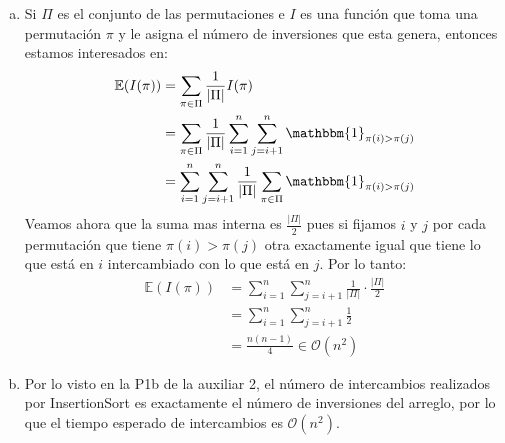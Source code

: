 \documentclass[dcc,uchile]{fcfmcourse}
\begin{document}
\begin{problems}
\begin{enumerate}[a)]
    \item Si $\Pi$ es el conjunto de las permutaciones e $I$ es una función que toma una permutación $\pi$ y le asigna el número de inversiones que esta genera, entonces estamos interesados en:
    \begin{align*}
        \mathbb{E}(I(\pi)) &= \sum_{\pi \in \Pi} \frac{1}{|\Pi|}I(\pi)\\
        &= \sum_{\pi \in \Pi} \frac{1}{|\Pi|}\sum_{i=1}^n \sum_{j=i+1}^n \mathbbm{1}_{\pi(i) > \pi(j)}\\
        &=\sum_{i=1}^n \sum_{j=i+1}^n \frac{1}{|\Pi|} \sum_{\pi \in \Pi}  \mathbbm{1}_{\pi(i) > \pi(j)}
    \end{align*}
    Veamos ahora que la suma mas interna es $\frac{|\Pi|}{2}$ pues si fijamos $i$ y $j$ por cada permutación que tiene $\pi(i) > \pi(j)$ otra exactamente igual que tiene lo que está en $i$ intercambiado con lo que está en $j$. Por lo tanto:
    \begin{align*}
        \mathbb{E}(I(\pi)) &= \sum_{i=1}^n \sum_{j=i+1}^n \frac{1}{|\Pi|}\cdot \frac{|\Pi|}{2}\\
        &= \sum_{i=1}^n \sum_{j=i+1}^n \frac{1}{2}\\
        &= \frac{n(n-1)}{4} \in \mathcal{O}(n^2)
    \end{align*}
    \item Por lo visto en la P1b de la auxiliar 2, el número de intercambios realizados por InsertionSort es exactamente el número de inversiones del arreglo, por lo que el tiempo esperado de intercambios es $\mathcal{O}(n^2)$.
\end{enumerate}
\\
\end{problems}
\end{document}
